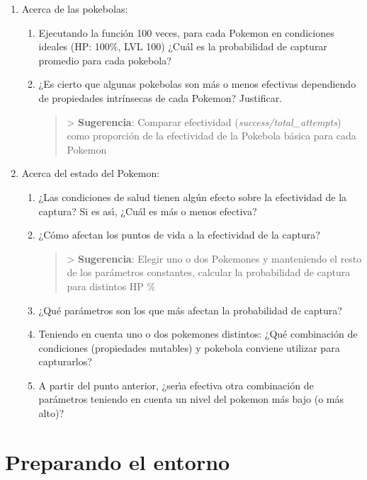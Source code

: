 \documentclass[11pt]{article}
\providecommand{\tightlist}{%
      \setlength{\itemsep}{0pt}\setlength{\parskip}{0pt}}
\begin{document}
\begin{enumerate}
\def\labelenumi{\arabic{enumi}.}
\tightlist
\item
  Acerca de las pokebolas:

  \begin{enumerate}
  \def\labelenumii{\arabic{enumii}.}
  \tightlist
  \item
    Ejecutando la función 100 veces, para cada Pokemon en condiciones
    ideales (HP: 100\%, LVL 100) ¿Cuál es la probabilidad de capturar
    promedio para cada pokebola?
  \item
    ¿Es cierto que algunas pokebolas son más o menos efectivas
    dependiendo de propiedades intrínsecas de cada Pokemon? Justificar.
    \begin{quote}
      \textgreater{} \textbf{Sugerencia}: Comparar efectividad
      (\emph{success/total\_attempts}) como proporción de la efectividad
      de la Pokebola básica para cada Pokemon
    \end{quote}
  \end{enumerate}
\item
  Acerca del estado del Pokemon:

  \begin{enumerate}
  \def\labelenumii{\arabic{enumii}.}
  \item
    ¿Las condiciones de salud tienen algún efecto sobre la efectividad
    de la captura? Si es ası́, ¿Cuál es más o menos efectiva?
  \item
    ¿Cómo afectan los puntos de vida a la efectividad de la captura?
    \begin{quote}
      \textgreater{} \textbf{Sugerencia}: Elegir uno o dos Pokemones y
      manteniendo el resto de los parámetros constantes, calcular la
      probabilidad de captura para distintos HP \%
    \end{quote}
  \item
    ¿Qué parámetros son los que más afectan la probabilidad de captura?
  \item
    Teniendo en cuenta uno o dos pokemones distintos: ¿Qué combinación
    de condiciones (propiedades mutables) y pokebola conviene utilizar
    para capturarlos?
  \item
    A partir del punto anterior, ¿serı́a efectiva otra combinación de
    parámetros teniendo en cuenta un nivel del pokemon más bajo (o más
    alto)?
  \end{enumerate}
\end{enumerate}

    \section{Preparando el entorno}\label{preparando-el-entorno}
\end{document}
